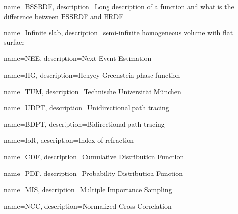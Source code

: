 {
    name={BSSRDF},
    description={Long description of a function and what is the difference
    between BSSRDF and BRDF}
}

{
    name={Infinite slab},
    description={semi-infinite homogeneous volume with flat surface}
}

{
    name={NEE},
    description={Next Event Estimation}
}

{
    name={HG},
    description={Henyey-Greenstein phase function}
}

{
    name={TUM},
    description={Technische Universität München}
}

{
    name={UDPT},
    description={Unidirectional path tracing}
}

{
    name={BDPT},
    description={Bidirectional path tracing}
}

{
    name={IoR},
    description={Index of refraction}
}

{
    name={CDF},
    description={Cumulative Distribution Function}
}

{
    name={PDF},
    description={Probability Distribution Function}
}

{
    name={MIS},
    description={Multiple Importance Sampling}
}

{
    name={NCC},
    description={Normalized Cross-Correlation}
}
